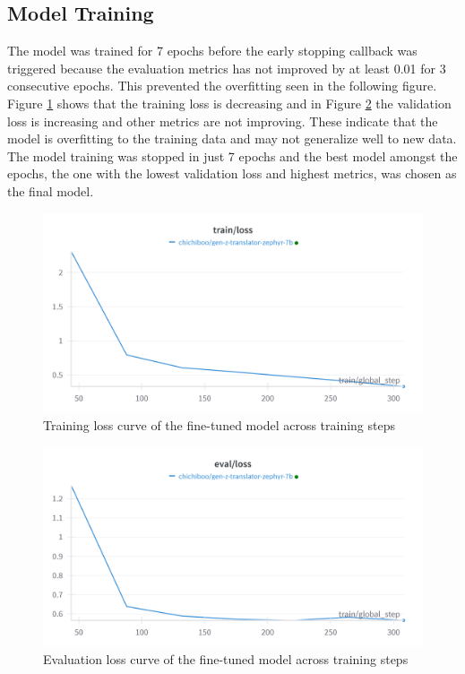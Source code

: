 \subsection{Model Training}
The model was trained for 7 epochs before the early stopping callback was triggered because the evaluation metrics has not improved by at least 0.01 for 3 consecutive epochs. This prevented the overfitting seen in the following figure. 
Figure \ref{fig:train_loss} shows that the training loss is decreasing and in Figure \ref{fig:eval_loss} the validation loss is increasing and other metrics are not improving. These indicate that the model is overfitting to the training data and may not generalize well to new data. The model training was stopped in just 7 epochs and the best model amongst the epochs, the one with the lowest validation loss and highest metrics, was chosen as the final model.
\begin{figure}[!htbp]
	\centering
	\includegraphics[scale=0.2]{figures/TrainLoss.png}
	\caption{Training loss curve of the fine-tuned model across training steps}
	\label{fig:train_loss}
\end{figure}
\begin{figure}[!htbp]
	\centering
	\includegraphics[scale=0.2]{figures/EvaluationLoss.png}
	\caption{Evaluation loss curve of the fine-tuned model across training steps}
	\label{fig:eval_loss}
\end{figure}
